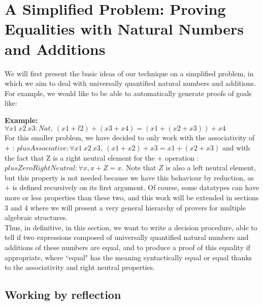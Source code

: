 \section{A Simplified Problem: Proving Equalities with Natural Numbers and Additions}

\label{sect:ideas}

We will first present the basic ideas of our technique on a simplified problem, in which we aim to deal with universally quantified natural numbers and additions.
For example, we would like to be able to automatically generate proofs of goals like:

\noindent
\textbf{Example:}
$\forall x1\ x2\ x3:Nat,\ (x1 + l2) + (x3 + x4) = (x1 + (x2 + x3)) + x4$  \\
For this smaller problem, we have decided to only work with the associativity of $+$ : $plusAssociative : \forall x1\ x2\ x3,\ (x1 + x2) + x3 = x1 + (x2 + x3)$ and with the fact that Z is a right neutral element for the $+$ operation : $plusZeroRightNeutral : \forall x, x + Z = x$. Note that $Z$ is also a left neutral element, but this property is not needed because we have this behaviour by reduction, as $+$ is defined recursively on its first argument. Of course, some datatypes can have more or less properties than these two, and this work will be extended in sections 3 and 4 where we will present a very general hierarchy of provers for multiple algebraic structures. \\
Thus, in definitive, in this section, we want to write a decision procedure, able to tell if two expressions composed of universally quantified natural numbers and additions of these numbers are equal, and to produce a proof of this equality if appropriate, where ``equal" has the meaning syntactically equal or equal thanks to the associativity and right neutral properties.


\subsection{Working by reflection}

